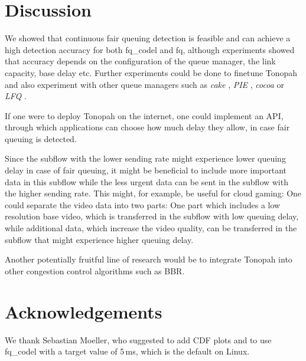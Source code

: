 \documentclass[conference]{IEEEtran}
\begin{document}
\section{Discussion}

We showed that continuous fair queuing detection is feasible and can achieve a high detection accuracy for both fq\_codel and fq, although experiments showed that accuracy depends on the configuration of the queue manager, the link capacity, base delay etc. 
Further experiments could be done to finetune Tonopah and also experiment with other queue managers such as \textit{cake} \cite{hoiland-jorgensen_piece_2018}, \textit{PIE} \cite{pan_pie_2013}, \textit{cocoa} \cite{bachl_cocoa_2019} or \textit{LFQ} \cite{bachl_lfq_2020}. 

If one were to deploy Tonopah on the internet, one could implement an API, through which applications can choose how much delay they allow, in case fair queuing is detected. 

Since the subflow with the lower sending rate might experience lower queuing delay in case of fair queuing, it might be beneficial to include more important data in this subflow while the less urgent data can be sent in the subflow with the higher sending rate. This might, for example, be useful for cloud gaming: One could separate the video data into two parts: One part which includes a low resolution base video, which is transferred in the subflow with low queuing delay, while additional data, which increase the video quality, can be transferred in the subflow that might experience higher queuing delay. 

Another potentially fruitful line of research would be to integrate Tonopah into other congestion control algorithms such as BBR. 

\section*{Acknowledgements}

We thank Sebastian Moeller, who suggested to add CDF plots and to use fq\_codel with a target value of 5\,ms, which is the default on Linux. 



\end{document}
